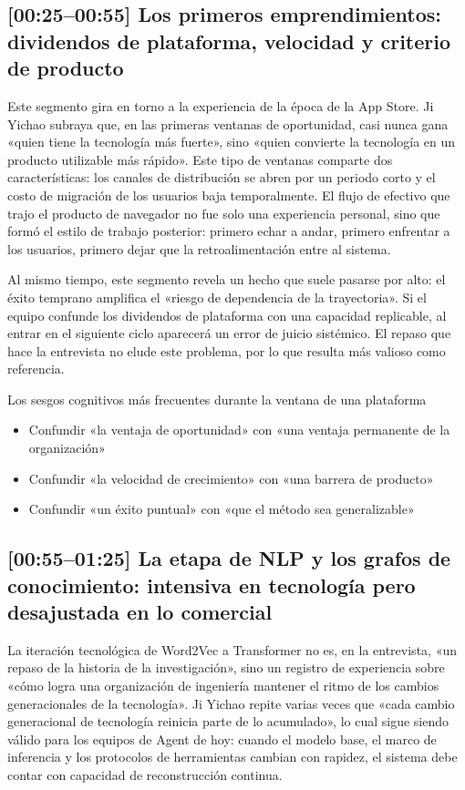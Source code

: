\subsection{[00:25--00:55] Los primeros emprendimientos: dividendos de plataforma, velocidad y criterio de producto}

Este segmento gira en torno a la experiencia de la época de la App Store. Ji Yichao subraya que, en las primeras ventanas de oportunidad, casi nunca gana «quien tiene la tecnología más fuerte», sino «quien convierte la tecnología en un producto utilizable más rápido». Este tipo de ventanas comparte dos características: los canales de distribución se abren por un periodo corto y el costo de migración de los usuarios baja temporalmente. El flujo de efectivo que trajo el producto de navegador no fue solo una experiencia personal, sino que formó el estilo de trabajo posterior: primero echar a andar, primero enfrentar a los usuarios, primero dejar que la retroalimentación entre al sistema.

Al mismo tiempo, este segmento revela un hecho que suele pasarse por alto: el éxito temprano amplifica el «riesgo de dependencia de la trayectoria». Si el equipo confunde los dividendos de plataforma con una capacidad replicable, al entrar en el siguiente ciclo aparecerá un error de juicio sistémico. El repaso que hace la entrevista no elude este problema, por lo que resulta más valioso como referencia.

\begin{warningbox}{Los sesgos cognitivos más frecuentes durante la ventana de una plataforma}
\begin{itemize}
    \item Confundir «la ventaja de oportunidad» con «una ventaja permanente de la organización»
    \item Confundir «la velocidad de crecimiento» con «una barrera de producto»
    \item Confundir «un éxito puntual» con «que el método sea generalizable»
\end{itemize}
\end{warningbox}

\subsection{[00:55--01:25] La etapa de NLP y los grafos de conocimiento: intensiva en tecnología pero desajustada en lo comercial}

La iteración tecnológica de Word2Vec a Transformer no es, en la entrevista, «un repaso de la historia de la investigación», sino un registro de experiencia sobre «cómo logra una organización de ingeniería mantener el ritmo de los cambios generacionales de la tecnología». Ji Yichao repite varias veces que «cada cambio generacional de tecnología reinicia parte de lo acumulado», lo cual sigue siendo válido para los equipos de Agent de hoy: cuando el modelo base, el marco de inferencia y los protocolos de herramientas cambian con rapidez, el sistema debe contar con capacidad de reconstrucción continua.

